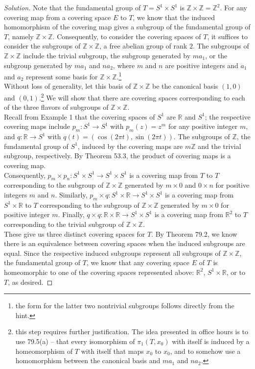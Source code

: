 \documentclass[11pt]{article}
\newcommand{\R}{\mathbb{R}}
\newcommand{\Z}{\mathbb{Z}}
\newenvironment{solution}
  {\renewcommand\qedsymbol{$\blacksquare$}\begin{proof}[Solution]}
  {\end{proof}}
\begin{document}
\begin{solution}
Note that the fundamental group of $T = S^1 \times S^1$ is $\Z \times \Z = \Z^2$. For any covering map from a covering space $E$ to $T$, we know that the induced homomorphism of the covering map
gives a subgroup of the fundamental group of $T$, namely $\Z \times \Z$. Consequently, to consider the covering spaces of $T$, it suffices to consider
the subgroups of $\Z \times \Z$, a free abelian group of rank $2$. The subgroups of $\Z \times \Z$ include the trivial subgroup,
the subgroup generated by $ma_1$, or the subgroup generated by $ma_1$ and $na_2$, where $m$ and $n$ are positive integers and $a_1$ and $a_2$ represent some basis for $\Z \times \Z$.\footnote{the form for the latter two nontrivial subgroups
follows directly from the hint.} \\

Without loss of generality, let this basis of $\Z \times \Z$ be the canonical basis $(1, 0)$ and $(0, 1)$.\footnote{this step requires further justification. The idea presented in office hours 
is to use 79.5(a) -- that every isomorphism of $\pi_1(T, x_0)$ with itself is induced by a homeomorphism of $T$ with itself that maps $x_0$ to $x_0$,
and to somehow use a homomorphism between the canonical basis and $ma_1$ and $na_2$.} We will show that there are covering spaces
corresponding to each of the three flavors of subgroups of $\Z \times \Z$. \\

Recall from Example 1 that the covering spaces of $S^1$ are $\R$ and $S^1$; the respective covering maps include $p_m \colon S^1 \rightarrow  S^1$ with $p_m(z) = z^m$ for any positive integer $m$, and $q \colon \R \rightarrow S^1$ with $q(t) = (\cos (2\pi t), \sin (2\pi t))$.
The subgroups of $\Z$, the fundamental group of $S^1$, induced by the covering maps are $m\Z$ and the trivial subgroup, respectively.
By Theorem 53.3, the product of covering maps is a covering map. \\

Consequently, $p_m \times p_n \colon S^1 \times S^1 \rightarrow S^1 \times S^1$ is a covering map from $T$ to $T$ corresponding to the subgroup
of $\Z \times \Z$ generated by $m \times 0$ and $0 \times n$ for positive integers $m$ and $n$. Similarly, $p_m \times q \colon S^1 \times \R \rightarrow S^1 \times S^1$ is a covering map from $S^1 \times \R$ to $T$
corresponding to the subgroup of $\Z \times \Z$ generated by $m \times 0$ for positive integer $m$. Finally, $q \times q \colon \R \times \R \rightarrow S^1 \times S^1$ is a covering map from $\R^2$ to $T$
corresponding to the trivial subgroup of $\Z \times \Z$. \\

These give us three distinct covering spaces for $T$. By Theorem 79.2, we know there is an equivalence between covering spaces when the induced subgroups are equal. Since 
the respective induced subgroups represent all subgroups of $\Z \times \Z$, the fundamental group of $T$, we know that any covering space $E$ of $T$
is homeomorphic to one of the covering spaces represented above: $\R^2$, $S^1 \times \R$, or to $T$, as desired.
\end{solution}
\end{document}
